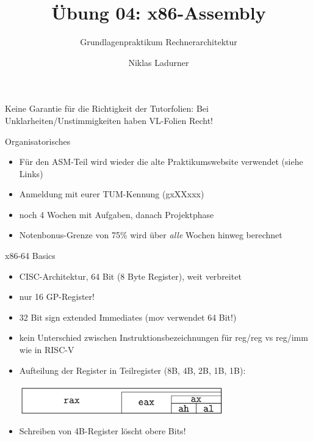 \documentclass[
  german,            %
  aspectratio=169,    %
]{tumbeamer}
\title{Übung 04: x86-Assembly}
\subtitle{Grundlagenpraktikum Rechnerarchitektur}
\author{Niklas Ladurner}
\institute{\theChairName\\\theDepartmentName\\\theUniversityName}
\date{\DTMdisplaydate{2024}{5}{10}{-1}}
\begin{document}
\maketitle

\begin{frame}[c]{}{}
  \begin{center}
    \LARGE  Keine Garantie für die Richtigkeit der Tutorfolien: Bei Unklarheiten/Unstimmigkeiten
    haben VL-Folien Recht!
  \end{center}
\end{frame}

\begin{frame}[c, fragile]{Organisatorisches}{}
  \begin{itemize}
    \item Für den ASM-Teil wird wieder die alte Praktikumswebsite verwendet (siehe Links)
    \item Anmeldung mit eurer TUM-Kennung (gxXXxxx)
    \item noch 4 Wochen mit Aufgaben, danach Projektphase
    \item Notenbonus-Grenze von 75\% wird über \textit{alle} Wochen hinweg berechnet
  \end{itemize}
\end{frame}

\begin{frame}[c, fragile]{x86-64 Basics}{}
  \begin{itemize}
    \item CISC-Architektur, 64 Bit (8 Byte Register), weit verbreitet
    \item nur 16 GP-Register!
    \item 32 Bit sign extended Immediates (mov verwendet 64 Bit!)
    \item kein Unterschied zwischen Instruktionsbezeichnungen für reg/reg vs reg/imm wie in RISC-V
    \item Aufteilung der Register in Teilregister (8B, 4B, 2B, 1B, 1B):
          \begin{center}
            \includegraphics[width=0.7\textwidth]{w04_reg_div.png}
          \end{center}
    \item Schreiben von 4B-Register löscht obere Bits!
  \end{itemize}
\end{frame}
\end{document}
